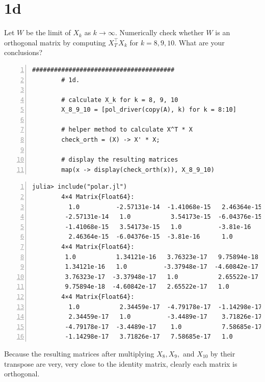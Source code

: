 \documentclass{article}
\begin{document}
    \section*{1d}
    Let $W$ be the limit of $X_k$ as $k \to \infty$. Numerically check whether $W$ is an orthogonal matrix by computing $X_T^\top X_k$ for $k = 8, 9, 10$. What are your conclusions?
    \vspace{1em}
    \begin{Verbatim}[frame=single, label=Check orthogonality of W, numbers=left, fontsize=\small, xleftmargin=0cm, framesep=3mm]
        #######################################
        # 1d.
  
        # calculate X_k for k = 8, 9, 10
        X_8_9_10 = [pol_driver(copy(A), k) for k = 8:10]
  
        # helper method to calculate X^T * X
        check_orth = (X) -> X' * X;
  
        # display the resulting matrices
        map(x -> display(check_orth(x)), X_8_9_10)
    \end{Verbatim}
    \vspace{1em}
    \begin{Verbatim}[frame=single, label=Julia REPL for resulting matrices, numbers=left, fontsize=\small, xleftmargin=0cm, framesep=3mm]
        julia> include("polar.jl")
        4×4 Matrix{Float64}:
          1.0          -2.57131e-14  -1.41068e-15   2.46364e-15
         -2.57131e-14   1.0           3.54173e-15  -6.04376e-15
         -1.41068e-15   3.54173e-15   1.0          -3.81e-16
          2.46364e-15  -6.04376e-15  -3.81e-16      1.0
        4×4 Matrix{Float64}:
         1.0           1.34121e-16   3.76323e-17   9.75894e-18
         1.34121e-16   1.0          -3.37948e-17  -4.60842e-17
         3.76323e-17  -3.37948e-17   1.0           2.65522e-17
         9.75894e-18  -4.60842e-17   2.65522e-17   1.0
        4×4 Matrix{Float64}:
          1.0           2.34459e-17  -4.79178e-17  -1.14298e-17
          2.34459e-17   1.0          -3.4489e-17    3.71826e-17
         -4.79178e-17  -3.4489e-17    1.0           7.58685e-17
         -1.14298e-17   3.71826e-17   7.58685e-17   1.0
    \end{Verbatim}
    Because the resulting matrices after multiplying $X_8, X_9,$ and $X_{10}$ by their transpose are very, very close to the identity matrix, clearly each matrix is orthogonal.

    \newpage
\end{document}
